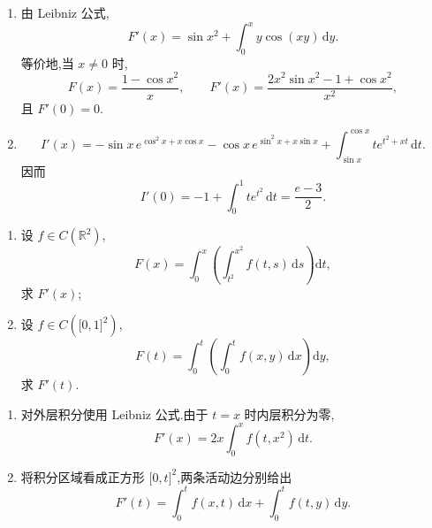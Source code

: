 \begin{solution}
    \leavevmode
    \begin{enumerate}
        \item 由 Leibniz 公式,
              \[
                  F'(x)=\sin x^2+\int_0^x y\cos(xy)\,\mathrm{d}y.
              \]
              等价地,当 $x\neq0$ 时,
              \[
                  F(x)=\dfrac{1-\cos x^2}{x},
                  \qquad
                  F'(x)=\dfrac{2x^2\sin x^2-1+\cos x^2}{x^2},
              \]
              且 $F'(0)=0$.
        \item
              \[
                  I'(x)=-\sin x\,e^{\cos^2x+x\cos x}
                  -\cos x\,e^{\sin^2x+x\sin x}
                  +\int_{\sin x}^{\cos x}t e^{t^2+xt}\,\mathrm{d}t.
              \]
              因而
              \[
                  I'(0)=-1+\int_0^1t e^{t^2}\,\mathrm{d}t
                  =\dfrac{e-3}{2}.
              \]
    \end{enumerate}
\end{solution}

\begin{example}
    \begin{enumerate}
        \item 设 $f\in C(\mathbb{R}^2)$,
              \[
                  F(x)=\int_0^x\left(\int_{t^2}^{x^2}f(t,s)\,\mathrm{d}s\right)\mathrm{d}t,
              \]
              求 $F'(x)$;
        \item 设 $f\in C(\lbrack0,1\rbrack^2)$,
              \[
                  F(t)=\int_0^t\left(\int_0^t f(x,y)\,\mathrm{d}x\right)\mathrm{d}y,
              \]
              求 $F'(t)$.
    \end{enumerate}
\end{example}
\exampleblank

\begin{solution}
    \leavevmode
    \begin{enumerate}
        \item 对外层积分使用 Leibniz 公式.由于 $t=x$ 时内层积分为零,
              \[
                  F'(x)=2x\int_0^x f(t,x^2)\,\mathrm{d}t.
              \]
        \item 将积分区域看成正方形 $\lbrack0,t\rbrack^2$,两条活动边分别给出
              \[
                  F'(t)=\int_0^t f(x,t)\,\mathrm{d}x
                  +\int_0^t f(t,y)\,\mathrm{d}y.
              \]
    \end{enumerate}
\end{solution}

